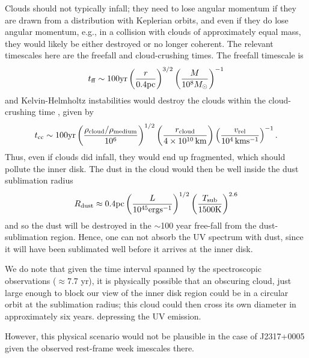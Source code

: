 \documentclass[a4paper,fleqn,usenatbib]{mnras}
\begin{document}
Clouds should not typically infall; they need to lose angular momentum
if they are drawn from a distribution with Keplerian orbits, and even
if they do lose angular momentum, e.g., in a collision with clouds of 
approximately equal mass, they would likely be either destroyed or no
longer coherent. The relevant timescales here are the freefall and
cloud-crushing times. The freefall timescale is 
\begin{equation}
    t_{{\rm ff}}   \sim 100   {\rm yr}  
                     \left( \frac{ r } {0.4\rm{pc} }\right)^{3/2} 
                                            \left(\frac{M}{10^{8}M_{\odot}}\right)^{-1}
\end{equation}
and Kelvin-Helmholtz instabilities would destroy the clouds within the
cloud-crushing time \citep[e.g., ][]{Nagakura2008, Hopkins2013,
Shiokawa2015, Bae2016}, given by
\begin{equation}
    t_{\rm cc} \sim 100{\rm yr} \left(\frac{\rho_{{\rm cloud}}/\rho_{{\rm medium}}} {10^{6}}\right)^{1/2} 
                                            \left(\frac{r_{\rm cloud}}{4 \times 10^{10} \, \rm{km}}\right) 
                                            \left(\frac{v_{\rm rel}}{10^{4} \, \rm{km s^{-1}}}\right)^{-1}.
\label{eqn:T_cloudcrushing}
\end{equation}
Thus, even if clouds did infall, they would end up fragmented, which
should pollute the inner disk.  The dust in the cloud would then be
well inside the dust sublimation radius 
\begin{equation}
    R_{\rm dust} \approx 0.4{\rm pc}\left(\frac{L}{10^{45}\rm{erg s^{-1}}}\right)^{1/2}
                                                   \left(\frac{T_{\rm sub}}{1500\rm{K}}\right)^{2.6}
\end{equation}
and so the dust will be destroyed in the $\sim$100 year free-fall from
the dust-sublimation region. Hence, one can not absorb the UV spectrum
with dust, since it will have been sublimated well before it arrives
at the inner disk.

We do note that given the time interval spanned by the spectroscopic
observations ($\approx$7.7 yr), it is physically possible that an
obscuring cloud, just large enough to block our view of the inner disk
region could be in a circular orbit at the sublimation radius; this
cloud could then cross its own diameter in approximately six years. 
depressing the UV emission. 

However, this physical scenario would not be plausible in the case 
of J2317+0005 given the observed rest-frame week imescales there. 
\end{document}

